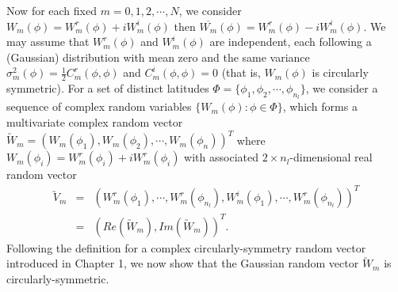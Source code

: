Now for each fixed $m = 0, 1, 2, \cdots, N$, we consider  $W_m(\phi) = W_m^r(\phi) + i W_m^i(\phi)$ then $\overline{W_m}(\phi) = W_m^r(\phi) - i W_m^i(\phi)$. We may assume that $W_m^r(\phi)$ and $W_m^i(\phi)$ are independent, each following a (Gaussian) distribution with mean zero and the same variance $\sigma_m^2(\phi) = \frac{1}{2}C_m^r(\phi, \phi)$ and $C_m^i(\phi, \phi) = 0$ (that is, $W_m(\phi)$ is circularly symmetric). For a set of distinct latitudes $\Phi = \{\phi_1, \phi_2, \cdots, \phi_{n_l}\}$, we consider a sequence of complex random variables $\{W_m(\phi): \phi \in \Phi\}$, which forms a multivariate complex random vector $\utilde{W}_m = (W_m(\phi_1), W_m(\phi_2), \cdots, W_m(\phi_n))^T$ where $W_m(\phi_i) = W_m^r(\phi_i) + iW_m^r(\phi_i)$ with associated $2\times n_l$-dimensional real random vector
\begin{eqnarray*}
		\utilde{V}_m  &=& (W_m^r(\phi_1),\cdots,W_m^r(\phi_{n_l}), W_m^i(\phi_1), \cdots, W_m^r(\phi_{n_l}))^T \\
		&=& (Re(\utilde{W}_m), Im(\utilde{W}_m))^T.
	\end{eqnarray*}
Following the definition for a complex circularly-symmetry random vector introduced in Chapter 1, we now show that the Gaussian random vector $\utilde{W}_m$ is circularly-symmetric. \\
		

